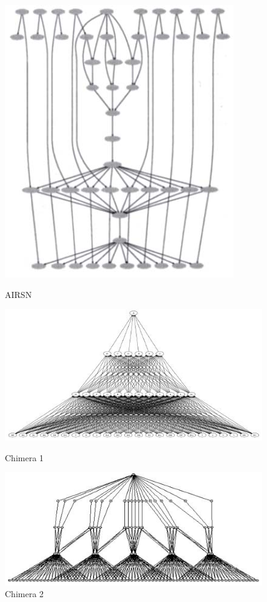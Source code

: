 \documentclass[a4paper,10pt]{article}
\begin{document}
\begin{figure}[!htb]

\centering
\includegraphics[scale=.25]{figures/airsn.png}
\caption{AIRSN \protect\cite{bit}}
\label{airsn}

\includegraphics[scale=.25]{figures/chimera1.png}
\caption{Chimera 1 \protect\cite{bit}}
\label{chimera1}

\includegraphics[scale=.25]{figures/chimera2.png}
\caption{Chimera 2 \protect\cite{bit}}
\label{chimera2}


\end{figure}
\end{document}
